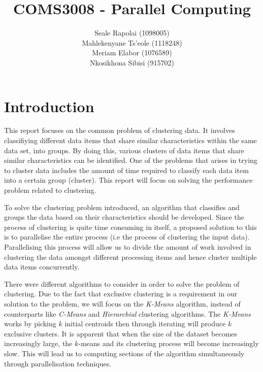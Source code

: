 \documentclass[12pt]{article}
\begin{document}
	\title{COMS3008 - Parallel Computing}
	\author{Seale Rapolai (1098005)
          \\ Mahlekenyane Ts'eole (1118248)
          \\ Meriam Elabor (1076589)
          \\ Nkosikhona Sibisi (915702)
    }
	\maketitle

	\section{Introduction}
    	\begin{flushleft}
      		This report focuses on the common problem of clustering data. It involves classifiying different data items that share similar characteristics within the same data set, into groups. By doing this, various clusters of data items that share similar characteristics can be identified. One of the problems that arises in trying to cluster data includes the amount of time required to classify each data item into a certain group (cluster). This report will focus on solving the performance problem related to clustering.
    	\end{flushleft}

      \begin{flushleft}
          To solve the clustering problem introduced, an algorithm that classifies and groups the data based on their characteristics should be developed. Since the process of clustering is quite time consuming in itself, a proposed solution to this is to parallelise the entire process (i.e the process of clustering the input data). Parallelising this process will allow us to divide the amount of work involved in clustering the data amongst different processing items and hence cluster multiple data items concurrently.
      \end{flushleft}

      \begin{flushleft}
          There were different algorithms to consider in order to solve the problem of clustering. Due to the fact that exclusive clustering is a requirement in our solution to the problem, we will focus on the \textit{K-Means} algorithm, instead of counterparts like \textit{C-Means} and \textit{Hierarchial} clustering algorithms. The \textit{K-Means} works by picking $k$ initial centroids then through iterating will produce $k$ exclusive clusters. It is apparent that when the size of the dataset becomes increasingly large, the $k$-means and its clustering process will become increasingly slow. This will lead us to computing sections of the algorithm simultaneously through parallelisation techniques.
      \end{flushleft}
\end{document}
